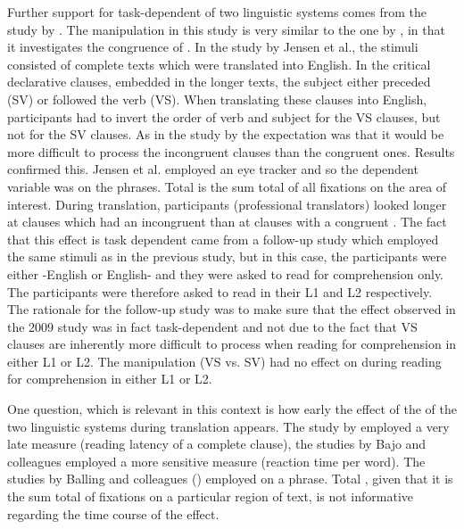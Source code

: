 \documentclass[output=paper]{LSP/langsci}
\begin{document}
Further support for task-dependent  of two linguistic systems comes from the study by \citet{Jensen2009Effects}. The manipulation in this study is very similar to the one by \citet{Ruiz2008Activation}, in that it investigates the congruence of . In the study by Jensen et al., the stimuli consisted of complete  texts which were translated into English. In the critical declarative clauses, embedded in the longer texts, the subject either preceded (SV) or followed the verb (VS). When translating these clauses into English, participants had to invert the order of verb and subject for the VS clauses, but not for the SV clauses. As in the study by \citet{Ruiz2008Activation} the expectation was that it would be more difficult to process the incongruent clauses than the congruent ones. Results confirmed this. Jensen et al. employed an eye tracker and so the dependent variable was  on the phrases. Total  is the sum total of all fixations on the area of interest. During translation, participants (professional translators) looked longer at clauses which had an incongruent  than at clauses with a congruent . The fact that this effect is task dependent came from a follow-up study \citep{WintherBalling2014a} which employed the same stimuli as in the previous study, but in this case, the participants were either -English  or English-  and they were asked to read for comprehension only. The participants were therefore asked to read in their L1 and L2 respectively. The rationale for the follow-up study was to make sure that the effect observed in the 2009 study was in fact task-dependent and not due to the fact that VS clauses are inherently more difficult to process when reading for comprehension in either L1 or L2. The manipulation (VS vs. SV) had no effect on  during reading for comprehension in either L1 or L2.

One question, which is relevant in this context is how early the effect of the  of the two linguistic systems during translation appears. The study by \citet{Shreve1993} employed a very late measure (reading latency of a complete clause), the studies by Bajo and colleagues employed a more sensitive measure (reaction time per word). The studies by Balling and colleagues (\citeyearpar{Jensen2009Effects,WintherBalling2014a}) employed  on a phrase. Total , given that it is the sum total of fixations on a particular region of text, is not informative regarding the time course of the effect.
\end{document}
